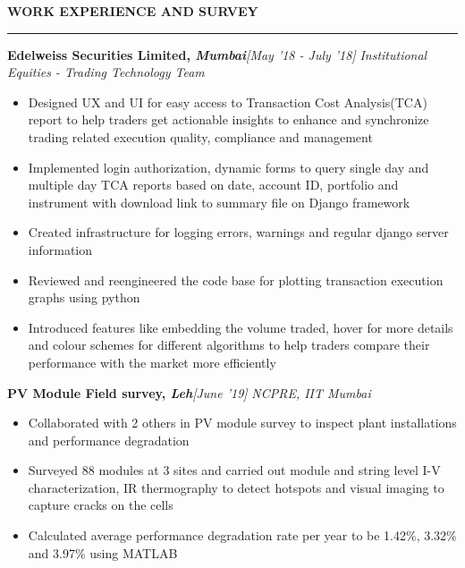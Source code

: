 \documentclass[11pt]{article}%
\begin{document}
\vspace*{4.2cm}

\begin{center}
\bf{\Large{WORK EXPERIENCE AND SURVEY}}
\end{center}
\vspace{-1mm}
\hrule
\vspace{1 pt}
{\flushleft \bf {\large{Edelweiss Securities Limited}}, \em{Mumbai}}\hfill {{{\em{[May '18 - July '18]}}}}
\vspace{-0.8em}
{\flushleft \em{Institutional Equities - Trading Technology Team}}
\vspace{-5pt}
\begin{itemize}[leftmargin=*]
    \setlength\itemsep{1.5pt}
    \setlength\parskip{1.5pt}
    \item Designed UX and UI for easy access to Transaction Cost Analysis(TCA) report to help traders get actionable insights to enhance and synchronize trading related execution quality, compliance and management
	\item Implemented login authorization, dynamic forms to query single day and multiple day TCA reports based on date, account ID, portfolio and instrument with download link to summary file on Django framework
	\item Created infrastructure for logging errors, warnings and regular django server information
	\item Reviewed and reengineered the code base for plotting transaction execution graphs using python
	\item Introduced features like embedding the volume traded, hover for more details and colour schemes for different algorithms to help traders compare their performance with the market more efficiently
\end{itemize}

{\flushleft \bf {\large{PV Module Field survey}}, \em{Leh}}\hfill {{{\em{[June '19]}}}}
\vspace{-0.8em}
{\flushleft \em{NCPRE, IIT Mumbai}}
\vspace{-5pt}
\begin{itemize}[leftmargin=*]
\setlength\itemsep{1.5pt}
\setlength\parskip{1.5pt}
\item Collaborated with 2 others in PV module survey to inspect plant installations and performance degradation
\item Surveyed 88 modules at 3 sites and carried out module and string level I-V characterization, IR thermography to detect hotspots and visual imaging to capture cracks on the cells
\item Calculated average performance degradation rate per year to be  1.42\%, 3.32\% and 3.97\% using MATLAB
\end{itemize}
\end{document}
